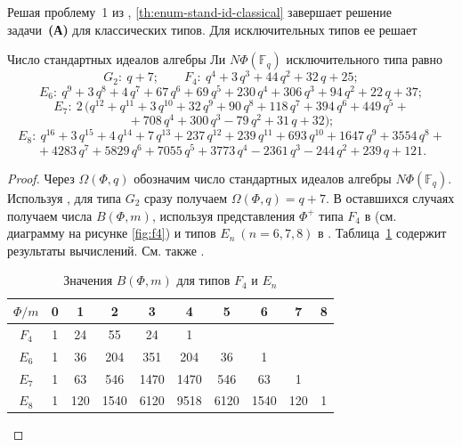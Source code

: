 \documentclass[a4paper,14pt,oneside,openany]{memoir}
\begin{document}
Решая проблему~1 из \cite{sigsam2001}, \cref{th:enum-stand-id-classical}
завершает решение задачи~\textbf{(А)} для классических типов. Для
исключительных типов ее решает
\begin{theorem}\label{th:enum-stand-id-exceptional}
    Число стандартных идеалов алгебры Ли $N\Phi(\mathbb{F}_q)$ исключительного типа
    равно
    \[G_2:\ q+7;\qquad F_4:\ q^4+3\,q^3+44\,q^2+32\,q+25;\]
    \[E_6:\ q^9+3\,q^8+4\,q^7+67\,q^6+69\,q^5+230\,q^4+306\,q^3+94\,q^2+22\,q+37;\]
    \[E_7:\ 2\,(q^{12}+q^{11}+3\,q^{10}+32\,q^9+90\,q^8+118\,q^7+394\,q^6+449\,q^5+{}\]
    \[{}+708\,q^4+300\,q^3-79\,q^2+31\,q+32);\]
    \[E_8:\ q^{16}+3\,q^{15}+4\,q^{14}+7\,q^{13}+237\,q^{12}+239\,q^{11}+693\,q^{10}+1647\,q^9+3554\,q^8+{}\]
    \[{}+4283\,q^7+5829\,q^6+7055\,q^5+3773\,q^4-2361\,q^3-244\,q^2+239\,q+121.\]
\end{theorem}
\begin{proof}
    Через $\Omega(\Phi, q)$ обозначим число стандартных идеалов алгебры
    $N\Phi(\mathbb{F}_q)$. Используя , для типа
    $G_2$ сразу получаем $\Omega(\Phi, q) = q+7$. В оставшихся случаях получаем
    числа $B(\Phi, m)$, используя представления $\Phi^+$ типа $F_4$ в
    \cite{vl90_ru} (см. диаграмму на рисунке \cref{fig:f4}) и типов $E_n\
    (n=6,7,8)$ в \cite{Suleymanova-Diss}. Таблица~\cref{table:Bmn} содержит
    результаты вычислений. См. также \cite[замечание 5.2]{athan2005}.
    \begin{table}[htbp]
        \begin{center}
            \begin{threeparttable}%
                \caption{Значения $B(\Phi,m)$ для типов $F_4$ и $E_n$}\label{table:Bmn}
                \begin{tabular}{ | c | c | c | c | c | c | c | c | c | c |}
                    \hline
                    $\Phi/m$ & 0 & 1   & 2    & 3    & 4    & 5    & 6    & 7   & 8 \\ \hline
                    $F_4$    & 1 & 24  & 55   & 24   & 1    &      &      &     &   \\ \hline
                    $E_6$    & 1 & 36  & 204  & 351  & 204  & 36   & 1    &     &   \\ \hline
                    $E_7$    & 1 & 63  & 546  & 1470 & 1470 & 546  & 63   & 1   &   \\ \hline
                    $E_8$    & 1 & 120 & 1540 & 6120 & 9518 & 6120 & 1540 & 120 & 1
                    \\\hline
                \end{tabular}
            \end{threeparttable}
        \end{center}
    \end{table}
\end{proof}
\end{document}
